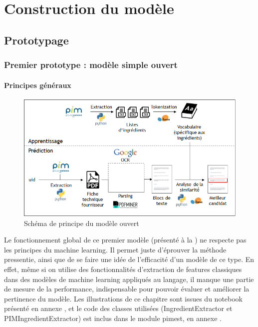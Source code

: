 \part{Construction du modèle}

    \chapter{Prototypage}
    \label{prototypes}

    \section{Premier prototype : modèle simple \og ouvert \fg}
        
        \subsection{Principes généraux}

            \begin{figure}[htbp]
                \begin{center}
                \includegraphics[width=0.9\linewidth]{img/open_model.png}
                \end{center}
                \caption{Schéma de principe du \og modèle ouvert \fg}
                \label{fig:open_model}
            \end{figure}     

            Le fonctionnement global de ce premier modèle (présenté à la ) ne respecte pas les principes du machine learning.
            Il permet juste d'éprouver la méthode pressentie, ainsi que de se faire une idée de l'efficacité d'un modèle de ce type.
            En effet, même si on utilise des fonctionnalités d'extraction de features classiques dans des modèles de machine learning appliqués au langage, il manque une partie de mesure de la performance, indispensable pour pouvoir évaluer et améliorer la pertinence du modèle.
            Les illustrations de ce chapitre sont issues du notebook présenté en annexe , et le code des classes utilisées (IngredientExtractor et PIMIngredientExtractor) est inclus dans le module pimest, en annexe .

